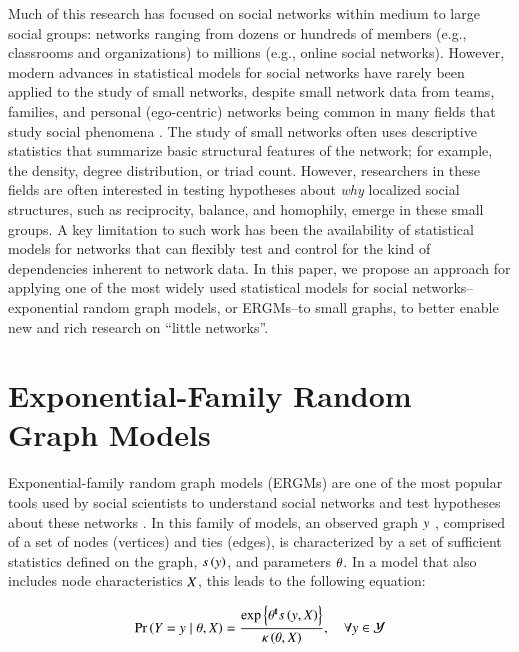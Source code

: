 \documentclass[review]{elsarticle}
\begin{document}
Much of this research has focused on social networks within medium to large social groups: networks ranging from dozens or hundreds of members (e.g., classrooms and organizations) to millions (e.g., online social networks). However, modern advances in statistical models for social networks have rarely been applied to the study of small networks, despite small network data from teams, families, and personal (ego-centric) networks being common in many fields that study social phenomena \cite{HENTTONEN201074, CarterDR2015, bott2001family,crossley2015social}. The study of small networks often uses descriptive statistics that summarize basic structural features of the network; for example, the density, degree distribution, or triad count. However, researchers in these fields are often interested in testing hypotheses about \textit{why} localized social structures, such as reciprocity, balance, and homophily, emerge in these small groups. A key limitation to such work has been the availability of statistical models for networks that can flexibly test and control for the kind of dependencies inherent to network data. In this paper, we propose an approach for applying one of the most widely used statistical models for social networks--exponential random graph models, or ERGMs--to small graphs, to better enable new and rich research on ``little networks''. 

\section{Exponential-Family Random Graph Models}

Exponential-family random graph models (ERGMs) are one of the most popular tools used by social scientists to understand social networks and test hypotheses about these networks  \cite[][and others]{Robins2007,Holland1981,Frank1986,Wasserman1996,Snijders2006}. In this family of models, an observed graph $y$ , comprised of a set of nodes (vertices) and ties (edges), is characterized by a set of sufficient statistics defined on the graph, $s\left(y\right)$, and parameters $\theta$. In a model that also includes node characteristics $X$, this leads to the following equation:

\begin{equation}
\label{eq:ergm}
  \Prcond{\Adjmat = \adjmat}{\params, \Indepvar} = \frac{%
  	\exp{\transpose{\params}\sufstats{\adjmat, \Indepvar}}%
  }{
  	\kappa\left(\params, \Indepvar\right)
  },\quad\forall \adjmat\in\ADJMAT
\end{equation}
\end{document}
